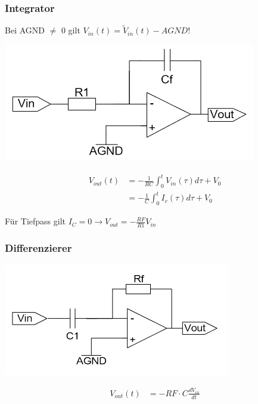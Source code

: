 \subsubsection{Integrator}
Bei AGND $\neq$ 0 gilt $V_{in}(t) = \tilde{V}_{in}(t) - AGND$!\\
\begin{minipage}{0.20\textwidth}
	\includegraphics[width=\linewidth,keepaspectratio=true]{./Images/integrator}
\end{minipage}%
\begin{minipage}{0.30\textwidth}
	\begin{align*}
		V_{out}(t) &= -\frac{1}{RC}\int_{0}^{t}V_{in}(\tau)d\tau + V_0 \\
		&= -\frac{1}{C}\int_{0}^{t}I_{c}(\tau)d\tau + V_0
	\end{align*}
\end{minipage}

Für Tiefpass gilt $I_C = 0 \xrightarrow{} V_{out} = - \frac{RF}{R1}V_{in}$

\subsubsection{Differenzierer}
\begin{minipage}{0.20\textwidth}
	\includegraphics[width=\linewidth,keepaspectratio=true]{./Images/differenzierer}
\end{minipage}%
\begin{minipage}{0.30\textwidth}
	\begin{align*}
		V_{out}(t) &= -RF\cdot C \frac{dV_{in}}{dt}
	\end{align*}
\end{minipage}

